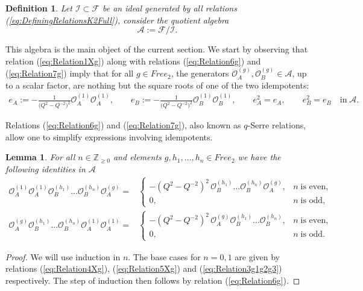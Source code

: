 \documentclass{amsart}
\newtheorem{definition}[theorem]{Definition}
\newtheorem{lemma}[theorem]{Lemma}
\newcommand{\Oa}{\mathcal O_A}
\newcommand{\Ob}{\mathcal O_B}
\begin{document}
\begin{definition}
Let $\mathcal I\subset\mathcal F$ be an ideal generated by all relations (\ref{eq:DefiningRelationsK2Full}), consider the quotient algebra
\begin{equation*}
\mathcal A:=\mathcal F/\mathcal I.
\end{equation*}
\end{definition}
This algebra is the main object of the current section. We start by observing that relation (\ref{eq:Relation1Xg}) along with relations (\ref{eq:Relation6g}) and (\ref{eq:Relation7g}) imply that for all $g\in Free_2$, the generators $\Oa^{(g)},\Ob^{(g)}\in\mathcal A$, up to a scalar factor, are nothing but the square roots of one of the two idempotents:
\begin{align}
e_A:=-\frac1{\big(Q^2-Q^{-2}\big)^2}\Oa^{(1)}\Oa^{(1)},\qquad e_B:=-\frac1{\big(Q^2-Q^{-2}\big)^2}\Ob^{(1)}\Ob^{(1)},\qquad e_A^2=e_A,\qquad e_B^2=e_B\quad\textrm{in}\;\mathcal A.
\label{eq:IdempotentsDef}
\end{align}

Relations (\ref{eq:Relation6g}) and (\ref{eq:Relation7g}), also known as $q$-Serre relations, allow one to simplify expressions involving idempotents.
\begin{lemma}
For all $n\in\mathbb Z_{\geq0}$ and elements $g,h_1,\dots,h_n\in Free_2$ we have the following identities in $\mathcal A$
\begin{subequations}
\begin{align}
\Oa^{(1)}\Oa^{(1)}\Ob^{(h_1)}\dots\Ob^{(h_n)}\Oa^{(g)}=&\left\{\begin{array}{cl}
-(Q^2-Q^{-2})^2\,\Ob^{(h_1)}\dots\Ob^{(h_n)}\Oa^{(g)},&n\;\textrm{is even},\\
0,&n\;\textrm{is odd},
\end{array}\right.
\label{eq:IdempotentALeftCancellation}\\[0.25em]
\Oa^{(g)}\Ob^{(h_1)}\dots\Ob^{(h_n)}\Oa^{(1)}\Oa^{(1)}=&\left\{\begin{array}{cl}
-(Q^2-Q^{-2})^2\,\Oa^{(g)}\Ob^{(h_1)}\dots\Ob^{(h_n)},&n\;\textrm{is even},\\
0,&n\;\textrm{is odd}.
\end{array}\right.
\label{eq:IdempotentARightCancellation}
\end{align}
\end{subequations}
\end{lemma}
\begin{proof}
We will use induction in $n$. The base cases for $n=0,1$ are given by relations (\ref{eq:Relation4Xg}), (\ref{eq:Relation5Xg}) and (\ref{eq:Relation3g1g2g3}) respectively. The step of induction then follows by relation (\ref{eq:Relation6g}).
\end{proof}
\end{document}
